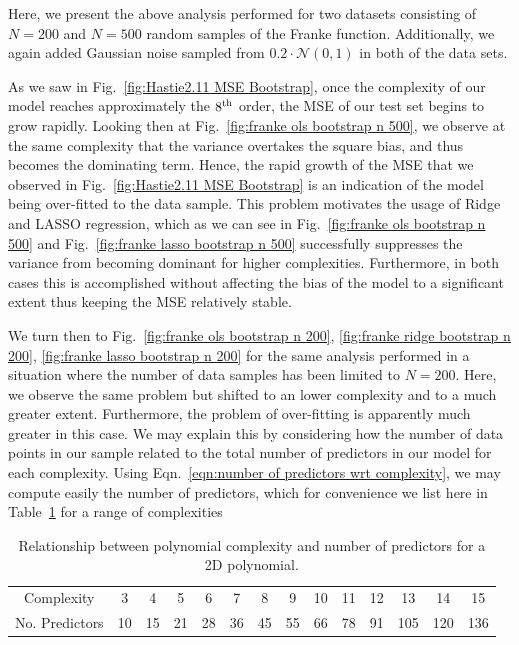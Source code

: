 \documentclass[reprint, english, nofootinbib]{revtex4-2}
\begin{document}
Here, we present the above analysis performed for two datasets consisting of $N=200$ and $N=500$ random samples of the Franke function. Additionally, we again added Gaussian noise sampled from $0.2 \cdot \mathcal N(0,1)$ in both of the data sets.

As we saw in Fig.~\ref{fig:Hastie2.11 MSE Bootstrap}, once the complexity of our model reaches approximately the $8^{\textup{th}}$ order, the MSE of our test set begins to grow rapidly. Looking then at Fig.~\ref{fig:franke ols bootstrap n 500}, we observe at the same complexity that the variance overtakes the square bias, and thus becomes the dominating term. Hence, the rapid growth of the MSE that we observed in Fig.~\ref{fig:Hastie2.11 MSE Bootstrap} is an indication of the model being over-fitted to the data sample.
This problem motivates the usage of Ridge and LASSO regression, which as we can see in Fig.~\ref{fig:franke ols bootstrap n 500} and Fig.~\ref{fig:franke lasso bootstrap n 500} successfully suppresses the variance from becoming dominant for higher complexities. Furthermore, in both cases this is accomplished without affecting the bias of the model to a significant extent thus keeping the MSE relatively stable.

We turn then to Fig.~\ref{fig:franke ols bootstrap n 200}, \ref{fig:franke ridge bootstrap n 200}, \ref{fig:franke lasso bootstrap n 200} for the same analysis performed in a situation where the number of data samples has been limited to $N=200$. Here, we observe the same problem but shifted to an lower complexity and to a much greater extent. Furthermore, the problem of over-fitting is apparently much greater in this case. We may explain this by considering how the number of data points in our sample related to the total number of predictors in our model for each complexity. Using Eqn.~\ref{eqn:number of predictors wrt complexity}, we may compute easily the number of predictors, which for convenience we list here in Table~\ref{tab: no predictors wrt complexity} for a range of complexities

\begin{table}[h!]
    \caption{\label{tab: no predictors wrt complexity}Relationship between polynomial complexity and number of predictors for a 2D polynomial.}
    \begin{tabular}{|c | c | c | c | c | c | c | c | c | c | c | c | c | c |}
    \hline
     Complexity     & 3  & 4  & 5  & 6  & 7  & 8  & 9  & 10 & 11 & 12 & 13 & 14 & 15 \\
     No. Predictors & 10 & 15 & 21 & 28 & 36 & 45 & 55 & 66 & 78 & 91 & 105 & 120 & 136
     \\ \hline
    \end{tabular}
\end{table}
\end{document}
